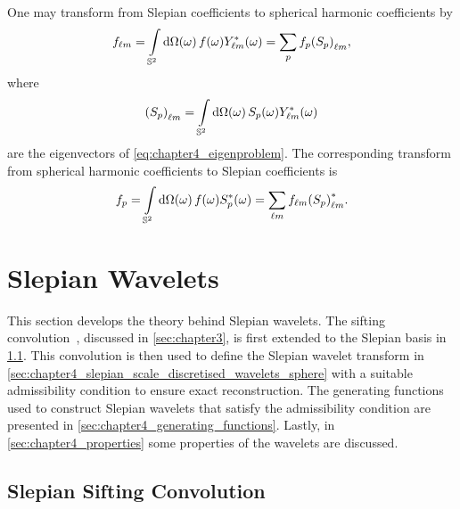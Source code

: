 One may transform from Slepian coefficients to spherical harmonic coefficients by
%
\begin{equation}
	{f}_{\ell m}
	= \displaystyle\int\limits_{\mathbb{S}^{2}} \dd{\Omega(\omega)} f(\omega) {Y}_{\ell m}^{\ast}(\omega)
	= \displaystyle\sum\limits_{p} {f}_{p}{({S}_{p})}_{\ell m},
\end{equation}
%
where
%
\begin{equation}\label{eq:chapter4_harmonic_slepian}
	{({S}_{p})}_{\ell m}
	= \displaystyle\int\limits_{\mathbb{S}^{2}} \dd{\Omega(\omega)} {S}_{p}(\omega) {Y}_{\ell m}^{\ast}(\omega)
\end{equation}
%
are the eigenvectors of \cref{eq:chapter4_eigenproblem}.
The corresponding transform from spherical harmonic coefficients to Slepian coefficients is
%
\begin{equation}\label{eq:chapter4_harmonic_to_slepian}
	{f}_{p}
	= \displaystyle\int\limits_{\mathbb{S}^{2}} \dd{\Omega(\omega)} f(\omega) {S}_{p}^{\ast}(\omega)
	= \displaystyle\sum\limits_{\ell m} {f}_{\ell m} {({S}_{p})}_{\ell m}^{\ast}.
\end{equation}

\section{Slepian Wavelets}\label{sec:chapter4_slepian_wavelets}

This section develops the theory behind Slepian wavelets.
The sifting convolution~\cite{Roddy2021}, discussed in \cref{sec:chapter3}, is first extended to the Slepian basis in \cref{sec:chapter4_slepian_sifting_convolution}.
This convolution is then used to define the Slepian wavelet transform in \cref{sec:chapter4_slepian_scale_discretised_wavelets_sphere} with a suitable admissibility condition to ensure exact reconstruction.
The generating functions used to construct Slepian wavelets that satisfy the admissibility condition are presented in \cref{sec:chapter4_generating_functions}.
Lastly, in \cref{sec:chapter4_properties} some properties of the wavelets are discussed.

\subsection{Slepian Sifting Convolution}\label{sec:chapter4_slepian_sifting_convolution}

